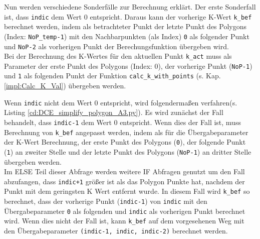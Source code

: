 {	Nun werden verschiedene Sonderfälle zur Berechnung erklärt. Der erste Sonderfall ist, dass \lstinline|indic| dem Wert 0 entspricht. Daraus kann der vorherige K-Wert \lstinline|k_bef| berechnet werden, indem als betrachteter Punkt der letzte Punkt des Polygons (Index: \lstinline|NoP_temp-1|) mit den Nachbarpunkten (als Index) \lstinline|0|  als folgender Punkt und \lstinline|NoP-2| als vorherigen Punkt der Berechungsfunktion übergeben wird. \\
	Bei der Berechnung des K-Wertes für den aktuellen Punkt \lstinline|k_act| muss als Parameter der erste Punkt des Polygons (Index: 0), der vorherige Punkt (\lstinline|NoP-1|) und \lstinline|1| als folgenden Punkt der Funktion \lstinline|calc_k_with_points| (s. Kap. \ref{impl:Calc_K_Val}) übergeben werden. \\
	\ifimportant
	
	\fi
	Wenn \lstinline|indic| nicht dem Wert 0 entspricht, wird folgendermaßen verfahren\ifimportant (s. Listing \ref{cd:DCE_simplify_polygon_A3.py})\fi.
	Es wird zunächst der Fall behandelt, dass \lstinline|indic-1| dem Wert 0 entspricht. Wenn dies der Fall ist, muss Berechnung von \lstinline|k_bef| angepasst werden, indem als für die Übergabeparameter der K-Wert Berechnung, der erste Punkt des Polygons (\lstinline|0|), der folgende Punkt (\lstinline|1|) an zweiter Stelle und der letzte Punkt des Polygons (\lstinline|NoP-1|) an dritter Stelle übergeben werden. \\
	Im ELSE Teil dieser Abfrage werden weitere IF Abfragen genutzt um den Fall abzufangen, dass \lstinline|indic+1| größer ist als das Polygon Punkte hat, nachdem der Punkt mit dem geringsten K Wert entfernt wurde. In diesem Fall wird \lstinline|k_bef| so berechnet, dass der vorherige Punkt (\lstinline|indic-1|) von \lstinline|indic| mit den Übergabeparameter \lstinline|0| als folgenden und \lstinline|indic| als vorherigen Punkt berechnet wird. Wenn dies nicht der Fall ist, kann \lstinline|k_bef| auf dem vorgesehenen Weg mit den Übergabeparameter \lstinline|(indic-1, indic, indic-2)| berechnet werden. \\

}
